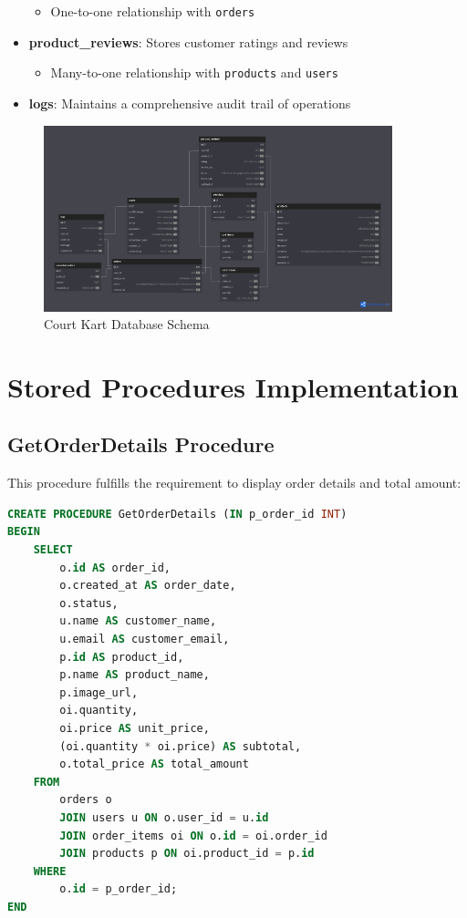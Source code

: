 \documentclass{article}
\begin{document}
\begin{itemize}
	      \begin{itemize}
		      \item One-to-one relationship with \texttt{orders}
	      \end{itemize}
	\item \textbf{product\_reviews}: Stores customer ratings and reviews
	      \begin{itemize}
		      \item Many-to-one relationship with \texttt{products} and \texttt{users}
	      \end{itemize}
	\item \textbf{logs}: Maintains a comprehensive audit trail of operations
\end{itemize}

\begin{figure}[H]
	\centering
	\includegraphics[width=0.9\textwidth]{../public/assets/images/db-schema.png}
	\caption{Court Kart Database Schema}
\end{figure}

\section{Stored Procedures Implementation}

\subsection{GetOrderDetails Procedure}
This procedure fulfills the requirement to display order details and total amount:

\begin{lstlisting}[language=SQL]
CREATE PROCEDURE GetOrderDetails (IN p_order_id INT)
BEGIN
    SELECT
        o.id AS order_id,
        o.created_at AS order_date,
        o.status,
        u.name AS customer_name,
        u.email AS customer_email,
        p.id AS product_id,
        p.name AS product_name,
        p.image_url,
        oi.quantity,
        oi.price AS unit_price,
        (oi.quantity * oi.price) AS subtotal,
        o.total_price AS total_amount
    FROM
        orders o
        JOIN users u ON o.user_id = u.id
        JOIN order_items oi ON o.id = oi.order_id
        JOIN products p ON oi.product_id = p.id
    WHERE
        o.id = p_order_id;
END
\end{lstlisting}
\end{document}
